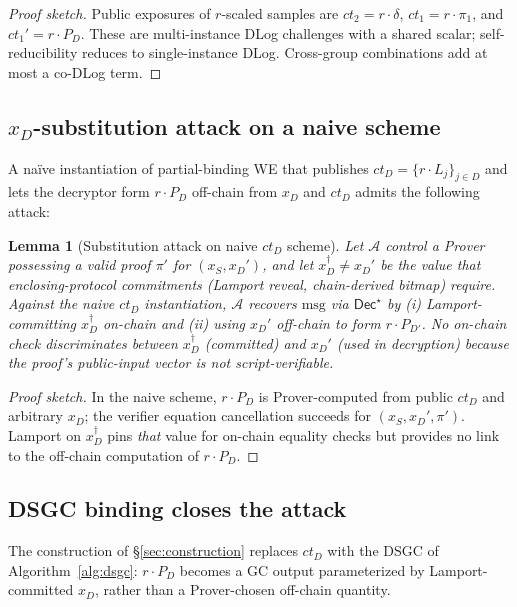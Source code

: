 \documentclass[11pt]{article}
\newtheorem{lemma}{Lemma}
\newcommand{\msg}{\mathrm{msg}}
\newcommand{\Dec}{\mathsf{Dec}}
\begin{document}
\begin{proof}[Proof sketch]
Public exposures of $r$-scaled samples are $ct_2 = r \cdot \delta$,
$ct_1 = r \cdot \pi_1$, and $ct_1' = r \cdot P_D$. These are
multi-instance DLog challenges with a shared scalar; self-reducibility
reduces to single-instance DLog. Cross-group combinations add at
most a co-DLog term.
\end{proof}

\subsection{$x_D$-substitution attack on a naive scheme}\label{sec:subst}

A na\"{i}ve instantiation of partial-binding WE that publishes
$ct_D = \{r \cdot L_j\}_{j \in D}$ and lets the decryptor form
$r \cdot P_D$ off-chain from $x_D$ and $ct_D$ admits the following
attack:

\begin{lemma}[Substitution attack on naive $ct_D$ scheme]\label{lem:attack}
Let $\mathcal{A}$ control a Prover possessing a valid proof $\pi'$
for $(x_S, x_D')$, and let $x_D^\dagger \neq x_D'$ be the value that
enclosing-protocol commitments (Lamport reveal, chain-derived
bitmap) require. Against the naive $ct_D$ instantiation, $\mathcal{A}$
recovers $\msg$ via $\Dec^\star$ by (i) Lamport-committing
$x_D^\dagger$ on-chain and (ii) using $x_D'$ off-chain to form
$r \cdot P_{D'}$. No on-chain check discriminates between
$x_D^\dagger$ (committed) and $x_D'$ (used in decryption) because
the proof's public-input vector is not script-verifiable.
\end{lemma}

\begin{proof}[Proof sketch]
In the naive scheme, $r \cdot P_D$ is Prover-computed from public
$ct_D$ and arbitrary $x_D$; the verifier equation cancellation
succeeds for $(x_S, x_D', \pi')$. Lamport on $x_D^\dagger$ pins
\emph{that} value for on-chain equality checks but provides no link
to the off-chain computation of $r \cdot P_D$.
\end{proof}

\subsection{DSGC binding closes the attack}

The construction of \S\ref{sec:construction} replaces $ct_D$ with the
DSGC of Algorithm~\ref{alg:dsgc}: $r \cdot P_D$ becomes a GC output
parameterized by Lamport-committed $x_D$, rather than a Prover-chosen
off-chain quantity.
\end{document}
